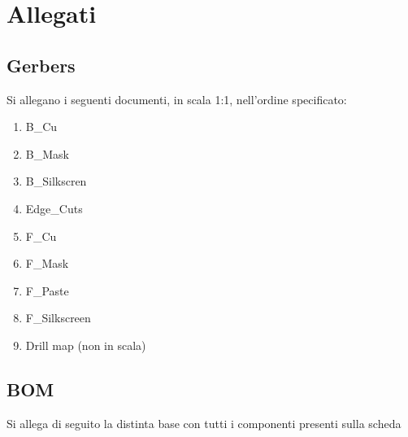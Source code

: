 \chapter{Allegati}

\hypertarget{gerbers}{%
\section{Gerbers}\label{gerbers}}
Si allegano i seguenti documenti, in scala 1:1, nell'ordine specificato:


\begin{enumerate}
    \item B\_Cu
    \item B\_Mask
    \item B\_Silkscren
    \item Edge\_Cuts
    \item F\_Cu
    \item F\_Mask
    \item F\_Paste 
    \item F\_Silkscreen
    \item Drill map (non in scala)
\end{enumerate}











\section{BOM}\label{gerber}
Si allega di seguito la distinta base con tutti i componenti presenti sulla scheda
